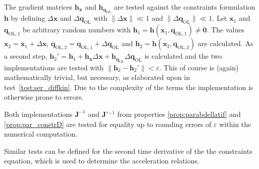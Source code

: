 \documentclass[runningheads]{llncs}
\begin{document}
\begin{test}\label{test:par_constrjac}
The gradient matrices $\bm{h}_{\bm{x}}$ and $\bm{h}_{\bm{q}_{\mathrm{OL}}}$ are tested against the constraints formulation $\bm{h}$ by defining $\Delta \bm{x}$ and $\Delta \bm{q}_{\mathrm{OL}}$ with $\lVert\Delta \bm{x}\rVert {\ll} 1$ and $\lVert\Delta \bm{q}_{\mathrm{OL}}\rVert {\ll} 1$. Let $\bm{x}_1$ and $\bm{q}_{\mathrm{OL},1}$ be arbitrary random numbers with $\bm{h}_1{=}\bm{h}(\bm{x}_1,\bm{q}_{\mathrm{OL},1}){\ne}\bm{0}$.
The values $\bm{x}_2{=}\bm{x}_1{+}\Delta \bm{x}$, $\bm{q}_{\mathrm{OL},2}{=}\bm{q}_{\mathrm{OL},1}{+}\Delta \bm{q}_{\mathrm{OL}}$ and $\bm{h}_2{=}\bm{h}(\bm{x}_2,\bm{q}_{\mathrm{OL},2})$ are calculated.
As a second step, $\bm{h}_2'{=}\bm{h}_1{+}\bm{h}_{\bm{x}} \Delta \bm{x} {+} \bm{h}_{\bm{q}_{\mathrm{OL}}} \Delta \bm{q}_{\mathrm{OL}}$ is calculated and the two implementations are tested with $\lVert\bm{h}_2{-}\bm{h}_2'\rVert {<} \varepsilon$.
This of course is (again) mathematically trivial, but necessary, as elaborated upon in test~\ref{test:ser_diffkin}.
Due to the complexity of the terms the implementation is otherwise prone to errors.
\end{test}


\begin{test}\label{test:par_jac}
Both implementations $\bm{J}^{-1}$ and $\bm{J}'{}^{-1}$ from properties \ref{prop:parabdellatif} and \ref{prop:par_constrD} are tested for equality up to rounding errors of $\varepsilon$ within the numerical computation.
\end{test}

Similar tests can be defined for the second time derivative of the the constraints equation, which is used to determine the acceleration relations.

\end{document}
